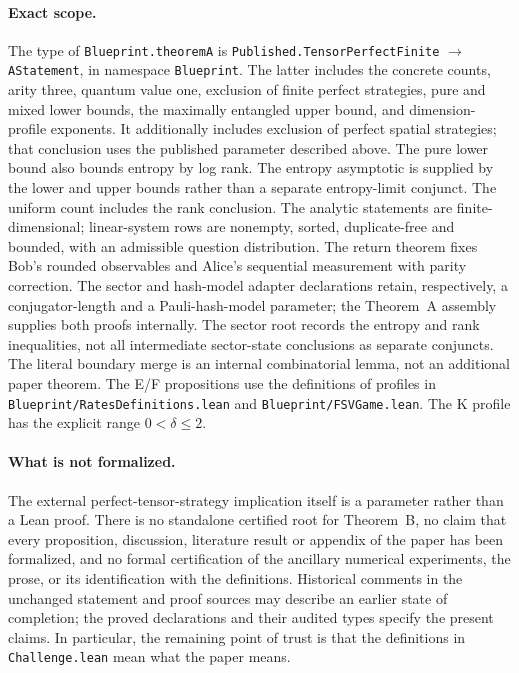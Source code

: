\paragraph{Exact scope.}
The type of \texttt{Blueprint.theoremA} is
\texttt{Published.TensorPerfectFinite} $\to$ \texttt{AStatement}, in namespace
\texttt{Blueprint}. The latter includes the concrete counts, arity three,
quantum value one, exclusion of finite perfect strategies, pure and mixed lower
bounds, the maximally entangled upper bound, and dimension-profile exponents.
It additionally includes exclusion of perfect spatial strategies; that conclusion
uses the published parameter described above. The pure lower bound also bounds
entropy by log rank. The entropy asymptotic is supplied by the lower and upper
bounds rather than a separate entropy-limit conjunct.
The uniform count includes the rank conclusion. The analytic statements are
finite-dimensional; linear-system rows are nonempty, sorted, duplicate-free and
bounded, with an admissible question distribution. The return theorem fixes
Bob's rounded observables and Alice's sequential measurement with parity
correction. The sector and hash-model adapter declarations retain, respectively,
a conjugator-length and a Pauli-hash-model parameter; the Theorem~A assembly
supplies both proofs internally. The sector root records the entropy and rank
inequalities, not all intermediate sector-state conclusions as separate conjuncts.
The literal boundary merge is an internal combinatorial lemma, not an additional
paper theorem. The E/F propositions use the definitions of profiles in
\texttt{Blueprint/RatesDefinitions.lean} and \texttt{Blueprint/FSVGame.lean}.
The K profile has the explicit range $0<\delta\le2$.

\paragraph{What is not formalized.}
The external perfect-tensor-strategy implication itself is a parameter rather
than a Lean proof. There is no standalone certified root for Theorem~B, no claim
that every proposition, discussion, literature result or appendix of the paper
has been formalized, and no formal certification of the ancillary numerical
experiments, the prose, or its identification with the definitions. Historical
comments in the unchanged statement and proof sources may describe an earlier
state of completion; the proved declarations and their audited types specify
the present claims. In particular, the remaining point of trust is that the
definitions in \texttt{Challenge.lean} mean what the paper means.
